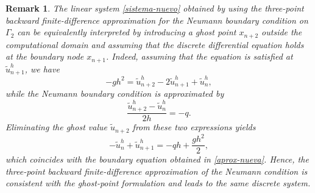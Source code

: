 \documentclass[11pt]{article}
\newtheorem{Remark}{Remark}
\begin{document}
\begin{Remark}
The linear system \eqref{sistema-nuevo} obtained by using the three-point backward finite-difference approximation for the Neumann boundary condition on $\Gamma_2$ can be equivalently interpreted by introducing a ghost point $x_{n+2}$ outside the computational domain and assuming that the discrete differential equation holds at the boundary node $x_{n+1}$.
Indeed, assuming that the equation is satisfied at ${\widetilde{u}^h_{n+1}}$, we have
\[
- g h^2 = {\widetilde{u}^h_{n+2}
- 2\widetilde{u}^h_{n+1}
+ \widetilde{u}^h_{n},}
\]
while the Neumann boundary condition is approximated by
\[
{\frac{\widetilde{u}^h_{n+2}-\widetilde{u}^h_{n}}{2h} }= -q .
\]
Eliminating the ghost value $\widetilde{u}_{n+2}$ from these two expressions yields
\[
{-\widetilde{u}^h_{n}+\widetilde{u}^h_{n+1}}
= -q h + \frac{g h^2}{2},
\]
which coincides with the boundary equation obtained in \eqref{aprox-nueva}.
Hence, the three-point backward finite-difference approximation of the Neumann condition is  consistent with the ghost-point formulation and leads to the same discrete system.
\end{Remark}
\end{document}

